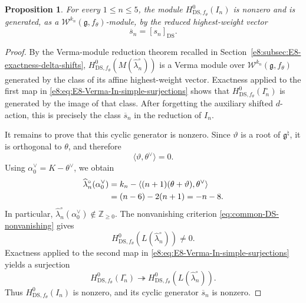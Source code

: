 \documentclass[11pt,reqno]{amsart}
\newtheorem{proposition}[theorem]{Proposition}
\theoremstyle{definition}
\theoremstyle{remark}
\providecommand{\Z}{\mathbb{Z}}
\providecommand{\g}{\mathfrak{g}}
\providecommand{\W}{\mathcal{W}}
\providecommand{\DS}{\mathrm{DS}}
\begin{document}
\begin{proposition}
\label{e8:prop:E8-reduction-In-cyclic-nonzero}
For every $1\le n\le5$, the module
$H^0_{\DS,f_{\theta}}(I_n)$ is nonzero and is generated, as a
$\W^{k_n}(\g,f_{\theta})$-module, by the reduced highest-weight vector
\begin{equation*}
  \overline{s}_n=[s_n]_{\DS}.
\end{equation*}
\end{proposition}

\begin{proof}
By the Verma-module reduction theorem recalled in
Section~\ref{e8:subsec:E8-exactness-delta-shifts},
$H^0_{\DS,f_{\theta}}(M(\widehat\lambda_n^{\circ}))$ is a Verma module over
$\W^{k_n}(\g,f_{\theta})$ generated by the class of its affine
highest-weight vector.  Exactness applied to the first map in
\eqref{e8:eq:E8-Verma-In-simple-surjections} shows that
$H^0_{\DS,f_{\theta}}(I_n^{\circ})$ is generated by the image of that class.
After forgetting the auxiliary shifted $d$-action, this is precisely the
class $\overline{s}_n$ in the reduction of $I_n$.

It remains to prove that this cyclic generator is nonzero.  Since
$\vartheta$ is a root of $\g^{\natural}$, it is orthogonal to $\theta$, and
therefore
\begin{equation*}
  \langle\vartheta,\theta^{\vee}\rangle=0.
\end{equation*}
Using $\alpha_0^{\vee}=K-\theta^{\vee}$, we obtain
\begin{align*}
  \widehat\lambda_n^{\circ}(\alpha_0^{\vee})
  &=k_n-
    \left\langle(n+1)(\theta+\vartheta),\theta^{\vee}\right\rangle
    \notag\\
  &=(n-6)-2(n+1)
   =-n-8.
\end{align*}
In particular,
$\widehat\lambda_n^{\circ}(\alpha_0^{\vee})\notin\Z_{\ge0}$.
The nonvanishing criterion
\eqref{eq:common-DS-nonvanishing} gives
\begin{equation*}
  H^0_{\DS,f_{\theta}}
  \!\left(L(\widehat\lambda_n^{\circ})\right)\neq0.
\end{equation*}
Exactness applied to the second map in
\eqref{e8:eq:E8-Verma-In-simple-surjections} yields a surjection
\begin{equation*}
  H^0_{\DS,f_{\theta}}(I_n^{\circ})
  \twoheadrightarrow
  H^0_{\DS,f_{\theta}}
  \!\left(L(\widehat\lambda_n^{\circ})\right).
\end{equation*}
Thus $H^0_{\DS,f_{\theta}}(I_n)$ is nonzero, and its cyclic generator
$\overline{s}_n$ is nonzero.
\end{proof}
\end{document}
